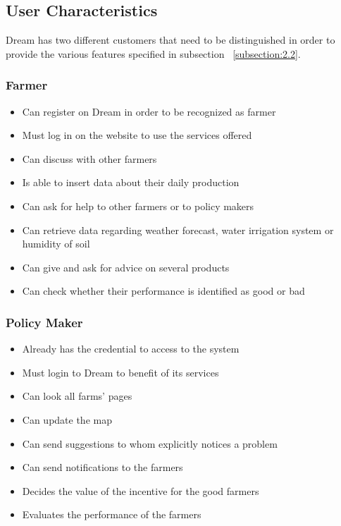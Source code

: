 \subsection{User Characteristics}
Dream has two different customers that need to be 
distinguished in order to provide the various 
features specified in subsection ~\ref{subsection:2.2}.

\subsubsection{Farmer}
\begin{itemize}
    \renewcommand\labelitemi{--}
    \item Can register on Dream in order to be recognized as farmer
    \item Must log in on the website to use the services offered
    \item Can discuss with other farmers
    \item Is able to insert data about their daily production
    \item Can ask for help to other farmers or to policy makers
    \item Can retrieve data regarding weather forecast, water irrigation system or humidity of soil
    \item Can give and ask for advice on several products
    \item Can check whether their performance is identified as good or bad
\end{itemize}

\subsubsection{Policy Maker}

\begin{itemize}
    \renewcommand\labelitemi{--}
    \item Already has the credential to access to the system
    \item Must login to Dream to benefit of its services
    \item Can look all farms' pages
    \item Can update the map
    \item Can send suggestions to whom explicitly notices a problem
    \item Can send notifications to the farmers
    \item Decides the value of the incentive for the good farmers
    \item Evaluates the performance of the farmers
\end{itemize}


